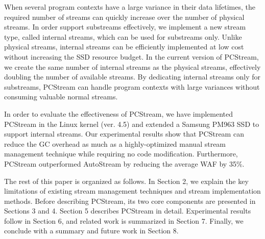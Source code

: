 When several program contexts have a large variance in their data lifetimes, 
the required number of streams can quickly increase over the number of physical streams.
In order support substreams effectively, we implement a new stream type, 
called internal streams, which can be used for substreams only. 
Unlike physical streams, internal streams can be efficiently
implemented at low cost without increasing the SSD resource budget.  
In the current version of \textsf{\small PCStream}, we create the same number of internal streams 
as the physical streams, effectively doubling the number of available streams. 
By dedicating internal streams only for substreams, \textsf{\small PCStream} can handle 
program contexts with large variances without consuming valuable normal
streams.

In order to evaluate the effectiveness of \textsf{\small PCStream}, 
we have implemented \textsf{\small PCStream}
in the Linux kernel (ver. 4.5) and 
extended a Samsung PM963 SSD to support internal streams.
Our experimental results show that \textsf{\small PCStream}
can reduce the GC overhead as much as a highly-optimized 
manual stream management technique while requiring no code modification.  
Furthermore, \textsf{\small PCStream} outperformed \textsf{\small AutoStream} 
by reducing the average WAF by 35\%.

The rest of this paper is organized as follows. 
In Section 2, we explain the key limitations of 
existing stream management techniques and stream implementation methods.
Before describing \textsf{\small PCStream}, its two core components are 
presented in Sections 3 and 4.
Section 5 describes \textsf{\small PCStream} in detail.
Experimental results follow in Section 6,
and related work is summarized in Section 7.  
Finally, we conclude with a summary and future work in Section 8.

